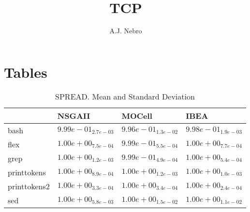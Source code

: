 \documentclass{article}
\title{TCP}
\author{A.J. Nebro}
\begin{document}
\maketitle
\section{Tables}

\begin{table}
\caption{SPREAD. Mean and Standard Deviation}
\label{table: SPREAD}
\centering
\begin{scriptsize}
\begin{tabular}{llll}
\hline & NSGAII & MOCell &  IBEA\\
\hline 
bash & $  9.99e-01_{ 2.7e-03}$ & \cellcolor{gray95}$  9.96e-01_{ 1.3e-02}$ & \cellcolor{gray25}$  9.98e-01_{ 1.9e-03}$ \\
flex & $  1.00e+00_{ 7.5e-04}$ & \cellcolor{gray95}$  9.99e-01_{ 5.5e-04}$ & \cellcolor{gray25}$  1.00e+00_{ 7.7e-04}$ \\
grep & $  1.00e+00_{ 1.2e-03}$ & \cellcolor{gray95}$  9.99e-01_{ 4.9e-04}$ & \cellcolor{gray25}$  1.00e+00_{ 5.4e-04}$ \\
printtokens & $  1.00e+00_{ 8.9e-04}$ & \cellcolor{gray95}$  1.00e+00_{ 1.2e-03}$ & \cellcolor{gray25}$  1.00e+00_{ 1.0e-03}$ \\
printtokens2 & $  1.00e+00_{ 3.3e-04}$ & \cellcolor{gray95}$  1.00e+00_{ 3.4e-04}$ & \cellcolor{gray25}$  1.00e+00_{ 2.4e-04}$ \\
sed & $  1.00e+00_{ 5.8e-03}$ & \cellcolor{gray25}$  1.00e+00_{ 1.5e-02}$ & \cellcolor{gray95}$  1.00e+00_{ 1.1e-02}$ \\
\hline
\end{tabular}
\end{scriptsize}
\end{table}
\end{document}
